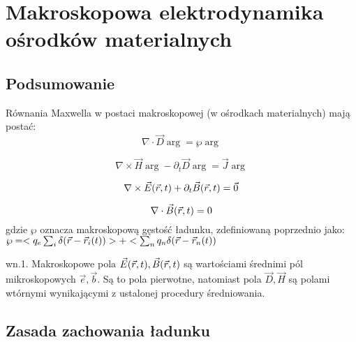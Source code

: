 \section{Makroskopowa elektrodynamika ośrodków materialnych}
\subsection{Podsumowanie}
Równania Maxwella w postaci makroskopowej (w ośrodkach materialnych) mają postać:
\begin{equation} \nabla \cdot \vec{D}\arg=\wp\arg \label{r1}
 \end{equation}
 
\begin{equation} \nabla \times \vec{H}\arg-\partial_t\vec{D}\arg=\vec{J}\arg \label{r2}
\end{equation}

\begin{equation} \nabla \times \vec{E}(\vec{r},t)+\partial_t \vec{B}(\vec{r},t)=\vec{0} \label{r3}\end{equation} 

\begin{equation} \nabla \cdot \vec{B}(\vec{r},t)=0 \end{equation}
gdzie $\wp$ oznacza makroskopową gęstość ładunku, zdefiniowaną poprzednio jako: $\wp=<q_e\sum_i\delta(\vec{r}-\vec{r}_i(t))>+<\sum_nq_n\delta(\vec{r}-\vec{r}_n(t))$

wn.1. Makroskopowe pola $\vec{E}(\vec{r},t),\vec{B}(\vec{r},t)$ są wartościami średnimi pól mikroskopowych $\vec{e},\vec{b}$. Są to pola pierwotne, natomiast pola $\vec{D},\vec{H}$ są polami wtórnymi wynikającymi z ustalonej procedury średniowania.

\subsection{Zasada zachowania ładunku}
